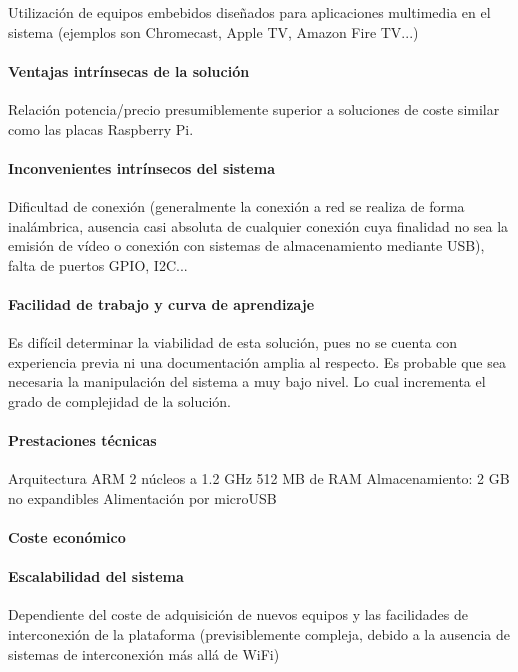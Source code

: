 Utilización de equipos embebidos diseñados para aplicaciones multimedia en el sistema (ejemplos son Chromecast, Apple TV, Amazon Fire TV...)

\paragraph{Ventajas intrínsecas de la solución}

Relación potencia/precio presumiblemente superior a soluciones de coste similar como las placas Raspberry Pi.

\paragraph{Inconvenientes intrínsecos del sistema}

Dificultad de conexión (generalmente la conexión a red se realiza de forma inalámbrica, ausencia casi absoluta de cualquier conexión cuya finalidad no sea la emisión de vídeo o conexión con sistemas de almacenamiento mediante USB), falta de puertos GPIO, I2C...

\paragraph{Facilidad de trabajo y curva de aprendizaje}
Es difícil determinar la viabilidad de esta solución, pues no se cuenta con experiencia previa ni una documentación amplia al respecto.
Es probable que sea necesaria la manipulación del sistema a muy bajo nivel. Lo cual incrementa el grado de complejidad de la solución.

\paragraph{Prestaciones técnicas}
Arquitectura ARM
2 núcleos a 1.2 GHz
512 MB de RAM
Almacenamiento: 2 GB no expandibles
Alimentación por microUSB

\paragraph{Coste económico}



\paragraph{Escalabilidad del sistema}
Dependiente del coste de adquisición de nuevos equipos y las facilidades de interconexión de la plataforma (previsiblemente compleja, debido a la ausencia de sistemas de interconexión más allá de WiFi)

